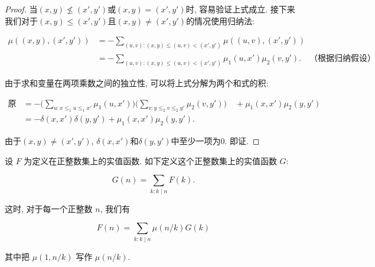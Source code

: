 \begin{proof}
    当\((x,y)\nleq (x',y')\)或\((x,y)= (x',y')\)时, 容易验证上式成立. 接下来我们对于\((x,y)\leq (x',y')\)且\((x,y)\neq (x',y')\)的情况使用归纳法:

    \begin{align*}
        \mu((x,y),(x',y')) & = -\sum_{(u,v) : (x,y) \leqslant (u,v) < (x',y')} \mu((u,v),(x',y'))                            \\
                           & = -\sum_{(u,v) : (x,y) \leqslant (u,v) < (x',y')} \mu_1(u,x')\mu_2(v,y'). \quad \text{（根据归纳假设）}
    \end{align*}

    由于求和变量在两项乘数之间的独立性, 可以将上式分解为两个和式的积:

    \begin{align*}
        \text{原式} & = - \Big( \sum_{u: x\leqslant_1 u \leqslant_1 x'} \mu_1(u, x') \Big) \Big( \sum_{v: y\leqslant_2 v \leqslant_2 y'} \mu_2(v, y') \Big) \quad + \mu_1(x, x') \mu_2(y, y') \\
                  & =-\delta(x,x')\delta(y,y')+ \mu_1(x, x') \mu_2(y, y').
    \end{align*}

    由于\((x,y)\neq (x',y')\), \(\delta(x,x')\)和\(\delta(y,y')\)中至少一项为0. 即证.
\end{proof}

\begin{theorem}
    设 \( F \) 为定义在正整数集上的实值函数. 如下定义这个正整数集上的实值函数 \( G \):

    \[ G(n) = \sum_{k:k \mid n} F(k). \]

    这时, 对于每一个正整数 \( n \), 我们有

    \[ F(n) = \sum_{k:k \mid n} \mu\left(n/k\right) G(k) \]

    其中把 \( \mu(1, n/k) \) 写作 \( \mu(n/k) \).
\end{theorem}

